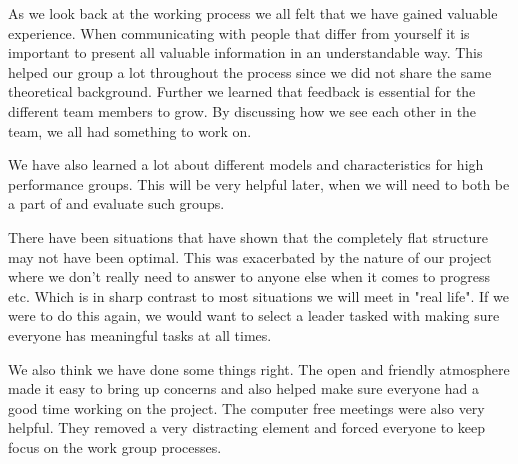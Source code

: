 As we look back at the working process we all felt that we have gained valuable experience. When communicating with people that differ from yourself it is important to present all valuable information in an understandable way. This helped our group a lot throughout the process since we did not share the same theoretical background. Further we learned that feedback is essential for the different team members to grow. By discussing how we see each other in the team, we all had something to work on.

We have also learned a lot about different models and characteristics for high performance groups. This will be very helpful later, when we will need to both be a part of and evaluate such groups.

There have been situations that have shown that the completely flat structure may not have been optimal. This was exacerbated by the nature of our project where we don't really need to answer to anyone else when it comes to progress etc. Which is in sharp contrast to most situations we will meet in "real life". If we were to do this again, we would want to select a leader tasked with making sure everyone has meaningful tasks at all times.

We also think we have done some things right. The open and friendly atmosphere made it easy to bring up concerns and also helped make sure everyone had a good time working on the project.  The computer free meetings were also very helpful. They removed a very distracting element and forced everyone to keep focus on the work group processes.